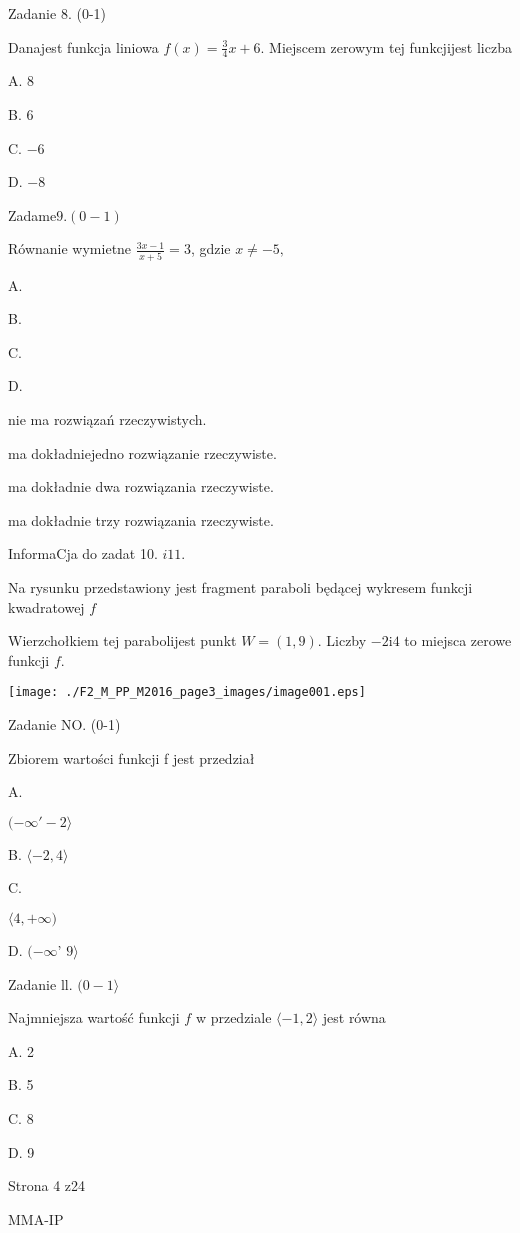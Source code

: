 \documentclass[a4paper,12pt]{article}
\begin{document}
Zadanie 8. (0-1)

Danajest funkcja liniowa $f(x)=\displaystyle \frac{3}{4}x+6$. Miejscem zerowym tej funkcjijest liczba

A. 8

B. 6

C. $-6$

D. $-8$

Zadam$\mathrm{e}9.(0-1)$

Równanie wymietne $\displaystyle \frac{3x-1}{x+5}=3$, gdzie $x\neq-5,$

A.

B.

C.

D.

nie ma rozwiązań rzeczywistych.

ma dokładniejedno rozwiązanie rzeczywiste.

ma dokładnie dwa rozwiązania rzeczywiste.

ma dokładnie trzy rozwiązania rzeczywiste.

InformaCja do zadat 10. $i11.$

Na rysunku przedstawiony jest fragment paraboli będącej wykresem funkcji kwadratowej $f$

Wierzchołkiem tej parabolijest punkt $W=(1,9)$. Liczby $-2\mathrm{i}4$ to miejsca zerowe funkcji $f.$
\begin{center}
\texttt{[image: ./F2\_M\_PP\_M2016\_page3\_images/image001.eps]}
\end{center}
Zadanie NO. (0-1)

Zbiorem wartości funkcji f jest przedział

A.

$(-\infty'-2\rangle$

B. $\langle-2,  4\rangle$

C.

$\langle 4,+\infty)$

D. $(-\infty$' $ 9\rangle$

Zadanie ll. $(0-1\rangle$

Najmniejsza wartość funkcji $f$ w przedziale $\langle-1,2\rangle$ jest równa

A. 2

B. 5

C. 8

D. 9

Strona 4 z24

MMA-IP
\end{document}
